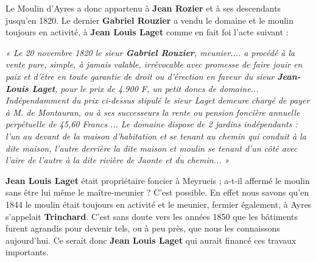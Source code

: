 Le Moulin d’Ayres a donc appartenu à \textbf{Jean Rozier} et à ses descendants jusqu’en 1820.
Le dernier \textbf{Gabriel Rouzier} a vendu le domaine et le moulin toujours en activité, à \textbf{Jean
Louis Laget} comme en fait foi l’acte suivant :

\vspace{0.25cm}

\begin{flushleft}
\hspace{1cm}
\parbox{0.82\textwidth}{
\textit{
« Le 20 novembre 1820 le sieur \textbf{Gabriel Rouzier}, meunier.... a procédé à la vente pure,
simple, à jamais valable, irrévocable avec promesse de faire jouir en paix et d’être en toute garantie
de droit ou d’érection en faveur du sieur \textbf{Jean-Louis Laget}, pour le prix de 4.900 F, un
petit doncs de domaine...
Indépendamment du prix ci-dessus stipulé le sieur Laget demeure chargé de payer à M. de
Montauran, ou à ses successeurs la rente ou pension foncière annuelle perpétuelle de 45,60
Francs ...
Le domaine dispose de 2 jardins indépendants : l’un au devant de la maison d’habitation et se
tenant au chemin qui conduit à la dite maison, l’autre derrière la dite maison et moulin se tenant
d’un côté avec l’aire de l’autre à la dite rivière de Jaonte et du chemin... »}
}
\end{flushleft}

\vspace{0.25cm}

\noindent
\textbf{Jean Louis Laget} était propriétaire foncier à Meyrueis ; a-t-il affermé le moulin sans être
lui même le maître-meunier ? C’est possible. En effet nous savons qu’en 1844 le moulin
était toujours en activité et le meunier, fermier également, à Ayres s’appelait \textbf{Trinchard}.
C’est sans doute vers les années 1850 que les bâtiments furent agrandis pour devenir tels,
ou à peu près, que nous les connaissons aujourd’hui. Ce serait donc \textbf{Jean Louis Laget}
qui aurait financé ces travaux importants.
